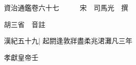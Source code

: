 






























































資治通鑑卷六十七　　　宋　司馬光　撰

胡三省　音註

漢紀五十九|{
	起閼逢敦牂盡柔兆涒灘凡三年}


孝獻皇帝壬


